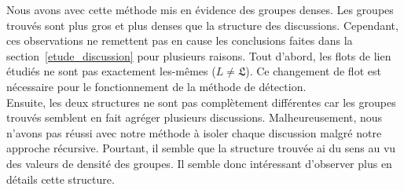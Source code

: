 Nous avons avec cette méthode mis en évidence des groupes denses.
Les groupes trouvés sont plus gros et plus denses que la structure des discussions.
Cependant, ces observations ne remettent pas en cause les conclusions faites dans la section~\ref{etude_discussion} pour plusieurs raisons.
Tout d'abord, les flots de lien étudiés ne sont pas exactement les-mêmes ($L\neq \mathfrak{L}$).
Ce changement de flot est nécessaire pour le fonctionnement de la méthode de détection.\\
Ensuite, les deux structures ne sont pas complètement différentes car les groupes trouvés semblent en fait agréger plusieurs discussions.
Malheureusement, nous n'avons pas réussi avec notre méthode à isoler chaque discussion malgré notre approche récursive.
Pourtant, il semble que la structure trouvée ai du sens au vu des valeurs de densité des groupes.
Il semble donc intéressant d'observer plus en détails cette structure.

